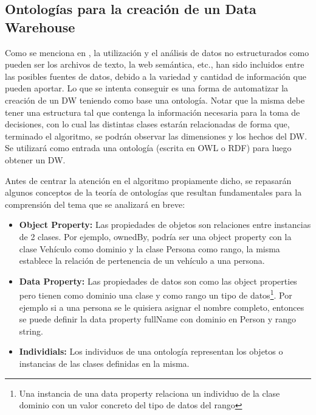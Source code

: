 \documentclass[a4paper,11pt]{article}
\begin{document}
  
    
    \subsection{Ontologías para la creación de un Data Warehouse}
    
    Como se menciona en \cite{ontologias}, la utilización y el análisis de datos no estructurados como pueden ser los archivos de texto, la web
    semántica, etc., han sido incluidos entre las posibles fuentes de datos, debido a la variedad y cantidad de información que pueden aportar. Lo que
    se intenta conseguir es una forma de automatizar la creación de un DW teniendo como base una ontología. Notar que la misma debe tener una
    estructura tal que contenga la información necesaria para la toma de decisiones, con lo cual las distintas clases estarán relacionadas de forma
    que, terminado el algoritmo, se podrán observar las dimensiones y los hechos del DW. Se utilizará como entrada una ontología (escrita en OWL o RDF)
    para luego obtener un DW.\par
    
    Antes de centrar la atención en el algoritmo propiamente dicho, se repasarán algunos conceptos de la teoría de ontologías que resultan fundamentales
    para la comprensión del tema que se analizará en breve:
    
    \begin{itemize}
      \item \textbf{Object Property:} Las propiedades de objetos son relaciones entre instancias de 2 clases. Por ejemplo, ownedBy, podría ser una
      object property con la clase Vehículo como dominio y la clase Persona como rango, la misma establece la relación de pertenencia de un vehículo a
      una persona.
      \item \textbf{Data Property:} Las propiedades de datos son como las object properties pero tienen como dominio una clase y como rango un tipo de
      datos\footnote{Una instancia de una data property relaciona un individuo de la clase dominio con un valor concreto del tipo de datos del rango}.
      Por ejemplo si a una persona se le quisiera asignar el nombre completo, entonces se puede definir la data property fullName con dominio en Person
      y rango string.
      \item \textbf{Individials:} Los individuos de una ontología representan los objetos o instancias de las clases definidas en la misma.
    \end{itemize}
    
\end{document}

